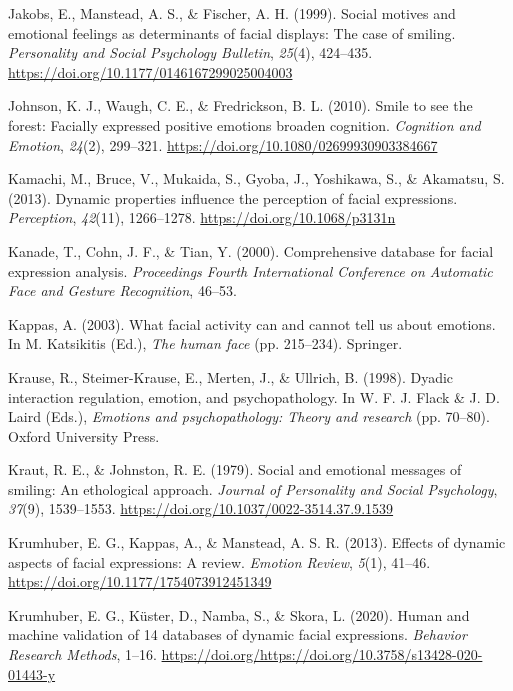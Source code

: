 \documentclass[
  english,
  doc]{apa7}
\newlength{\cslhangindent}
\newenvironment{cslreferences}%
  {\setlength{\parindent}{0pt}%
  \everypar{\setlength{\hangindent}{\cslhangindent}}\ignorespaces}%
  {\par}
\begin{document}
\begin{cslreferences}
\leavevmode\hypertarget{ref-jakobs1999social}{}%
Jakobs, E., Manstead, A. S., \& Fischer, A. H. (1999). Social motives and emotional feelings as determinants of facial displays: The case of smiling. \emph{Personality and Social Psychology Bulletin}, \emph{25}(4), 424--435. \url{https://doi.org/10.1177/0146167299025004003}

\leavevmode\hypertarget{ref-johnson2010smile}{}%
Johnson, K. J., Waugh, C. E., \& Fredrickson, B. L. (2010). Smile to see the forest: Facially expressed positive emotions broaden cognition. \emph{Cognition and Emotion}, \emph{24}(2), 299--321. \url{https://doi.org/10.1080/02699930903384667}

\leavevmode\hypertarget{ref-kamachi2013dynamic}{}%
Kamachi, M., Bruce, V., Mukaida, S., Gyoba, J., Yoshikawa, S., \& Akamatsu, S. (2013). Dynamic properties influence the perception of facial expressions. \emph{Perception}, \emph{42}(11), 1266--1278. \url{https://doi.org/10.1068/p3131n}

\leavevmode\hypertarget{ref-kanade2000comprehensive}{}%
Kanade, T., Cohn, J. F., \& Tian, Y. (2000). Comprehensive database for facial expression analysis. \emph{Proceedings Fourth International Conference on Automatic Face and Gesture Recognition}, 46--53.

\leavevmode\hypertarget{ref-kappas2003facial}{}%
Kappas, A. (2003). What facial activity can and cannot tell us about emotions. In M. Katsikitis (Ed.), \emph{The human face} (pp. 215--234). Springer.

\leavevmode\hypertarget{ref-krause1998dyadic}{}%
Krause, R., Steimer-Krause, E., Merten, J., \& Ullrich, B. (1998). Dyadic interaction regulation, emotion, and psychopathology. In W. F. J. Flack \& J. D. Laird (Eds.), \emph{Emotions and psychopathology: Theory and research} (pp. 70--80). Oxford University Press.

\leavevmode\hypertarget{ref-kraut1979social}{}%
Kraut, R. E., \& Johnston, R. E. (1979). Social and emotional messages of smiling: An ethological approach. \emph{Journal of Personality and Social Psychology}, \emph{37}(9), 1539--1553. \url{https://doi.org/10.1037/0022-3514.37.9.1539}

\leavevmode\hypertarget{ref-krumhuber2013effects}{}%
Krumhuber, E. G., Kappas, A., \& Manstead, A. S. R. (2013). Effects of dynamic aspects of facial expressions: A review. \emph{Emotion Review}, \emph{5}(1), 41--46. \url{https://doi.org/10.1177/1754073912451349}

\leavevmode\hypertarget{ref-krumhuber2020human}{}%
Krumhuber, E. G., Küster, D., Namba, S., \& Skora, L. (2020). Human and machine validation of 14 databases of dynamic facial expressions. \emph{Behavior Research Methods}, 1--16. \url{https://doi.org/https://doi.org/10.3758/s13428-020-01443-y}


\end{cslreferences}
\end{document}

